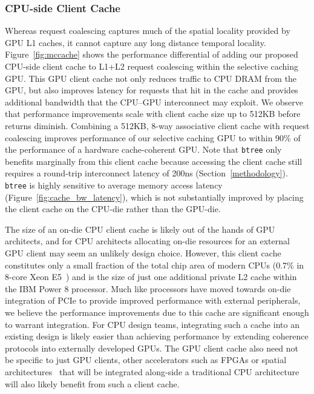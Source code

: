 \subsubsection{CPU-side Client Cache}
\label{mccache}
Whereas request coalescing captures much of the spatial locality provided by GPU L1 caches, it cannot capture
any long distance temporal locality. Figure~\ref{fig:mccache} shows
the performance differential of adding our proposed CPU-side client cache to L1+L2 request coalescing within the selective
caching GPU. This GPU client cache not only reduces traffic to CPU DRAM from the GPU, but also improves latency for requests
that hit in the cache and provides additional bandwidth that the CPU--GPU interconnect may exploit.  We observe
that performance improvements scale with client cache size up to 512KB before returns diminish.  Combining
a 512KB, 8-way associative client cache with request coalescing improves
performance of our selective caching GPU to within 90\% of the performance of a
hardware cache-coherent GPU\@. Note that \texttt{btree} only benefits marginally from
this client cache because accessing the client cache still requires a round-trip interconnect
latency of 200ns (Section~\ref{methodology}). \texttt{btree} is highly sensitive to
average memory access latency (Figure~\ref{fig:cache_bw_latency}), which is not substantially improved by
placing the client cache on the CPU-die rather than the GPU-die.

The size of an on-die CPU client cache is likely out of the hands of GPU architects, and
for CPU architects allocating on-die resources for an external GPU client may seem an
unlikely design choice.  However, this client cache constitutes only a small fraction of the
total chip area of modern CPUs (0.7\% in 8-core Xeon E5~\cite{XeonLLC2013}) and is the size of just one additional private L2 cache
within the IBM Power 8 processor.  Much like processors have moved towards on-die integration of PCIe to provide improved performance
with external peripherals, we believe the performance improvements due to this cache are significant enough to warrant integration. 
For CPU design teams, integrating such a cache into an existing design is likely easier than achieving performance by extending
coherence protocols into externally developed GPUs. The GPU client cache also need not be specific to just GPU clients,
other accelerators such as FPGAs or spatial architectures~\cite{Putnam2014,Parashar2013} that will be integrated along-side a traditional
CPU architecture will also likely benefit from such a client cache.


